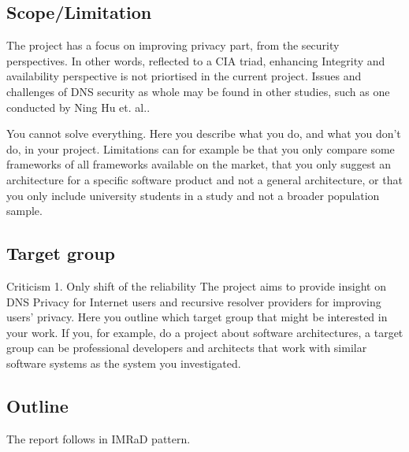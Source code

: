 \documentclass[a4paper,12pt]{article}
\begin{document}
\subsection{Scope/Limitation}
The project has a focus on improving privacy part, from the security perspectives. In other words, reflected to a CIA triad, enhancing Integrity and availability perspective is not priortised in the current project. Issues and challenges of DNS security as whole may be found in other studies, such as one conducted by Ning Hu et. al.\cite{ning2017dnssecurity}. 

You cannot solve everything. Here you describe what you do, and what you don't do, in your project. Limitations can for example be that you only compare some frameworks of all frameworks available on the market, that you only suggest an architecture for a specific software product and not a general architecture, or that you only include university students in a study and not a broader population sample.

\subsection{Target group}
Criticism
1. Only shift of the reliability
The project aims to provide insight on DNS Privacy for Internet users and recursive resolver providers for improving users' privacy.
Here you outline which target group that might be interested in your work. If you, for example, do a project about software architectures, a target group can be professional developers and architects that work with similar software systems as the system you investigated.

\subsection{Outline}
The report follows in IMRaD pattern.

\newpage
\
\end{document}
